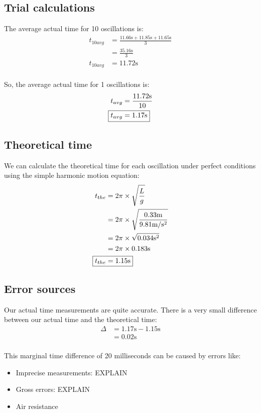 \documentclass[a4paper,12pt]{article}
\begin{document}
	\subsection{Trial calculations}
	The average actual time for 10 oscillations is:
	\begin{align*}
		t_{10avg}&=\frac{11.66\text{s}+11.85\text{s}+11.65\text{s}}{3}\\
		&=\frac{35.16\text{s}}{3} \\
		t_{10avg}&=11.72\text{s}\\
	\end{align*}
	
	So, the average actual time for 1 oscillations is:
	\begin{align*}
		t_{avg}&=\frac{11.72\text{s}}{10}\\
		\Aboxed{t_{avg}&=1.17\text{s}}
	\end{align*}
	
	\subsection{Theoretical time}
	We can calculate the theoretical time for each oscillation under perfect conditions using the simple harmonic motion equation:
	\begin{align*}
		t_{the}&=2\pi\times\sqrt{\frac{L}{g}}\\
		&=2\pi\times\sqrt{\frac{0.33\text{m}}{9.81\text{m}/\text{s}^2}}  \\
		&=2\pi\times\sqrt{0.034\text{s}^2}\\
		&=2\pi\times 0.183\text{s} \\
		\Aboxed{t_{the}&=1.15\text{s}}
	\end{align*} 
	
	\subsection{Error sources}
	Our actual time measurements are quite accurate. There is a very small difference between our actual time and the theoretical time:
	\begin{align*}
		\Delta&=1.17\text{s}-1.15\text{s} \\
		&=0.02\text{s}\\
	\end{align*}
	
	This marginal time difference of 20 milliseconds can be caused by errors like:
	\begin{itemize}
		\item Imprecise measurements: EXPLAIN
		\item Gross errors: EXPLAIN
		\item Air resistance
	\end{itemize}
\end{document}

